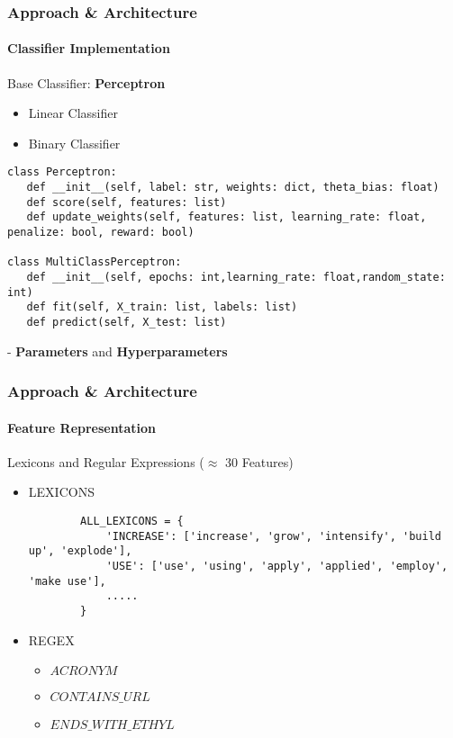 \documentclass[
  xcolor={svgnames},
  hyperref={colorlinks,citecolor=DeepPink4,linkcolor=DarkRed,urlcolor=DarkBlue}
  ]{beamer}
\begin{document}
\begin{frame}[fragile]
\frametitle{Approach \& Architecture}
\framesubtitle{Classifier Implementation}

Base Classifier: {\bf {\color{red} Perceptron}}
\begin{itemize}
	\item Linear Classifier
	\item Binary Classifier
\end{itemize}

\begin{verbatim}
class Perceptron:
   def __init__(self, label: str, weights: dict, theta_bias: float)
   def score(self, features: list)
   def update_weights(self, features: list, learning_rate: float, penalize: bool, reward: bool)

class MultiClassPerceptron:
   def __init__(self, epochs: int,learning_rate: float,random_state: int)
   def fit(self, X_train: list, labels: list)
   def predict(self, X_test: list)

\end{verbatim}
\bigskip
- {\bf Parameters} and {\bf Hyperparameters}

\end{frame}



\begin{frame}[fragile]
\frametitle{Approach \& Architecture}
\framesubtitle{Feature Representation}

Lexicons and Regular Expressions ($\approx$ 30 Features)
\bigskip

\begin{itemize}
	\item LEXICONS
		\begin{verbatim}
		ALL_LEXICONS = {
		    'INCREASE': ['increase', 'grow', 'intensify', 'build up', 'explode'],
		    'USE': ['use', 'using', 'apply', 'applied', 'employ', 'make use'],
		    .....
		}
		\end{verbatim}
	\bigskip
	\item REGEX
		\begin{itemize}
		    \item $ACRONYM$
		    \item $CONTAINS\_URL$
		    \item $ENDS\_WITH\_ETHYL$
		\end{itemize}
\end{itemize}

\end{frame}
\end{document}
